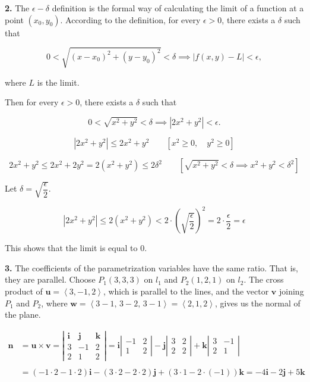 \documentclass{article}
\begin{document}
\vspace{1em}

\textbf{2.} The $\epsilon-\delta$ definition is the formal way of calculating the limit of a function at a point $(x_0,y_0)$. According to the definition, for every $\epsilon>0$, there exists a $\delta$ such that

\[0<\sqrt{(x-x_0)^2+(y-y_0)^2}<\delta\implies\left|f(x,y)-L\right|<\epsilon,\]

where $L$ is the limit.

Then for every $\epsilon>0$, there exists a $\delta$ such that

\[0<\sqrt{x^2+y^2}<\delta\implies\left|2x^2+y^2\right|<\epsilon.\]

\[\left|2x^2+y^2\right|\leq2x^2+y^2\qquad\left[x^2\geq0,\quad y^2\geq0\right]\]

\[2x^2+y^2\leq2x^2+2y^2=2\left(x^2+y^2\right)\leq2\delta^2\qquad\left[\sqrt{x^2+y^2}<\delta\implies  x^2+y^2<\delta^2\right]\]

Let $\delta=\sqrt{\dfrac{\epsilon}2}$.

\[\left|2x^2+y^2\right|\leq2\left(x^2+y^2\right)<2\cdot\left(\sqrt{\frac{\epsilon}2}\right)^2=2\cdot\frac{\epsilon}2=\epsilon\]

This shows that the limit is equal to $0$.

\vspace{1em}

\textbf{3.} The coefficients of the parametrization variables have the same ratio. That is, they are parallel. Choose $P_1(3,3,3)$ on $l_1$ and $P_2(1,2,1)$ on $l_2$. The cross product of $\mathbf u=\left\langle3,-1,2\right\rangle$, which is parallel to the lines, and the vector $\mathbf v$ joining $P_1$ and $P_2$, where $\mathbf w=\left\langle3-1,\,3-2,\,3-1\right\rangle=\left\langle2,1,2\right\rangle$, gives us the normal of the plane.

\begin{align*}\mathbf n&=\mathbf{u}\times\mathbf{v}=\left|\begin{array}{ccc}
\mathbf{i}&\mathbf{j}&\mathbf{k}\\
3&-1&2\\
2&1&2
\end{array}\right|=\mathbf{i}\left|\begin{array}{cc}
-1&2\\1&2
\end{array}\right|-\mathbf{j}\left|\begin{array}{cc}
3&2\\2&2
\end{array}\right|+\mathbf{k}\left|\begin{array}{cc}
3&-1\\2&1
\end{array}\right|\\\\&=(-1\cdot2-1\cdot2)\mathbf{i}-(3\cdot2-2\cdot2)\mathbf{j}+(3\cdot1-2\cdot(-1))\mathbf{k}=-4\mathbf i-2\mathbf j+5\mathbf k\end{align*}
\end{document}
